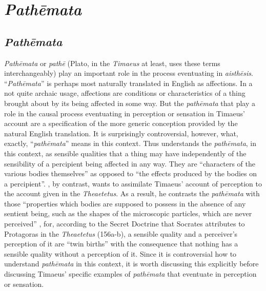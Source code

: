 
\chapter{\emph{Pathēmata}} %
\label{cha:pathemata}

\section{\emph{Pathēmata}} %
\label{sec:pathemata}

\emph{Pathēmata} or \emph{pathē} (Plato, in the \emph{Timaeus} at least, uses these terms interchangeably) play an important role in the process eventuating in \emph{aisthēsis}. ``\emph{Pathēmata}'' is perhaps most naturally translated in English as affections. In a not quite archaic usage, affections are conditions or characteristics of a thing brought about by its being affected in some way. But the \emph{pathēmata} that play a role in the causal process eventuating in perception or sensation in Timaeus' account are a specification of the more generic conception provided by the natural English translation. It is surprisingly controversial, however, what, exactly, ``\emph{pathēmata}'' means in this context. Thus \citet[429-31]{Taylor:1928qb} understands the \emph{pathēmata}, in this context, as sensible qualities that a thing may have independently of the sensibility of a percipient being affected in any way. They are ``characters of the various bodies themselves'' as opposed to ``the effects produced by the bodies on a percipient''. \citet[258-9]{Cornford:1935fk}, by contrast, wants to assimilate Timaeus' account of perception to the account given in the \emph{Theaetetus}. As a result, he contrasts the \emph{pathēmata} with those ``properties which bodies are supposed to possess in the absence of any sentient being, such as the shapes of the microscopic particles, which are never perceived'' \citep[259]{Cornford:1935fk}, for, according to the Secret Doctrine that Socrates attributes to Protagoras in the \emph{Theaetetus} (156a-b), a sensible quality and a perceiver's perception of it are ``twin births'' with the consequence that nothing has a sensible quality without a perception of it. Since it is controversial how to understand \emph{pathēmata} in this context, it is worth discussing this explicitly before discussing Timaeus' specific examples of \emph{pathēmata} that eventuate in perception or sensation.


